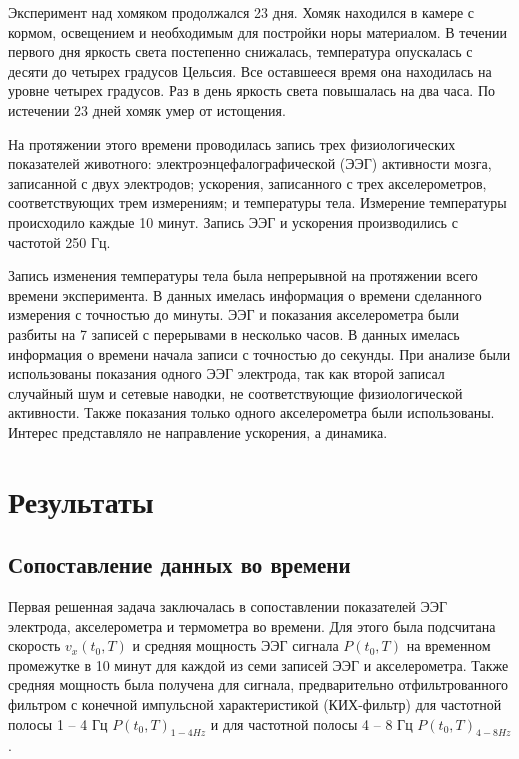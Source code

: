 \documentclass[12pt,a4paper,oneside]{article}
\begin{document}
Эксперимент над хомяком продолжался 23 дня. Хомяк находился в камере с кормом, освещением и необходимым для постройки норы материалом. В течении первого дня яркость света постепенно снижалась, температура опускалась с десяти до четырех градусов Цельсия. Все оставшееся время она находилась на уровне четырех градусов. Раз в день яркость света повышалась на два часа. По истечении 23 дней хомяк умер от истощения. 

На протяжении этого времени проводилась запись трех физиологических показателей животного: электроэнцефалографической (ЭЭГ) активности мозга, записанной с двух электродов; ускорения, записанного с трех акселерометров, соответствующих трем измерениям; и температуры тела. Измерение температуры происходило каждые 10 минут. Запись ЭЭГ и ускорения производились с частотой 250 Гц. 

Запись изменения температуры тела была непрерывной на протяжении всего времени эксперимента. В данных имелась информация о времени сделанного измерения с точностью до минуты. ЭЭГ и показания акселерометра были разбиты на 7 записей с перерывами в несколько часов. В данных имелась информация о времени начала записи с точностью до секунды. При анализе были использованы показания одного ЭЭГ электрода, так как второй записал случайный шум и сетевые наводки, не соответствующие физиологической активности. Также показания только одного акселерометра были использованы. Интерес представляло не направление ускорения, а динамика. 

\section{Результаты} %

\subsection{Сопоставление данных во времени}

Первая решенная задача заключалась в сопоставлении показателей ЭЭГ электрода, акселерометра и термометра во времени. Для этого была подсчитана скорость $v_{x}(t_0, T)$ и средняя мощность ЭЭГ сигнала $P(t_0, T)$ на временном промежутке в 10 минут для каждой из семи записей ЭЭГ и акселерометра. Также средняя мощность была получена для сигнала, предварительно отфильтрованного фильтром с конечной импульсной характеристикой (КИХ-фильтр) для частотной полосы 1 -- 4 Гц $P(t_0, T)_{1-4Hz}$ и для частотной полосы 4 -- 8 Гц $P(t_0, T)_{4-8Hz}$. 
\end{document}

